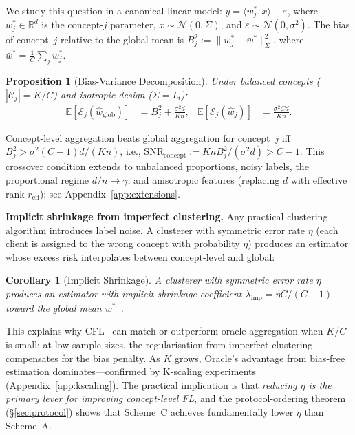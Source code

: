 \documentclass[11pt]{article}
\newcommand{\E}{\mathbb{E}}
\newcommand{\R}{\mathbb{R}}
\newcommand{\cC}{\mathcal{C}}
\newcommand{\cE}{\mathcal{E}}
\newcommand{\SNR}{\mathrm{SNR}_{\mathrm{concept}}}
\newcommand{\wstar}{w^*}
\newcommand{\what}{\hat{w}}
\newcommand{\wbar}{\bar{w}}
\newtheorem{proposition}[theorem]{Proposition}
\newtheorem{corollary}[theorem]{Corollary}
\begin{document}
We study this question in a canonical linear model: $y = \langle \wstar_j, x \rangle + \varepsilon$, where $\wstar_j \in \R^d$ is the concept-$j$ parameter, $x \sim \mathcal{N}(0, \Sigma)$, and $\varepsilon \sim \mathcal{N}(0, \sigma^2)$.
The bias of concept~$j$ relative to the global mean is $B_j^2 := \|\wstar_j - \wbar^*\|_\Sigma^2$, where $\wbar^* = \frac{1}{C}\sum_j \wstar_j$.

\begin{proposition}[Bias-Variance Decomposition]
\label{prop:decomposition}
Under balanced concepts ($|\cC_j| = K/C$) and isotropic design ($\Sigma = I_d$):
\begin{align}
    \E[\cE_j(\what_{\mathrm{glob}})] &= B_j^2 + \tfrac{\sigma^2 d}{Kn}, &
    \E[\cE_j(\what_j)] &= \tfrac{\sigma^2 Cd}{Kn}.
\end{align}
\end{proposition}
Concept-level aggregation beats global aggregation for concept~$j$ iff $B_j^2 > \sigma^2(C{-}1)d/(Kn)$, i.e., $\SNR := KnB_j^2/(\sigma^2 d) > C{-}1$.
This crossover condition extends to unbalanced proportions, noisy labels, the proportional regime $d/n \to \gamma$, and anisotropic features (replacing $d$ with effective rank $r_{\mathrm{eff}}$); see Appendix~\ref{app:extensions}.

\textbf{Implicit shrinkage from imperfect clustering.}
Any practical clustering algorithm introduces label noise.
A clusterer with symmetric error rate $\eta$ (each client is assigned to the wrong concept with probability $\eta$) produces an estimator whose excess risk interpolates between concept-level and global:

\begin{corollary}[Implicit Shrinkage]
\label{cor:implicit}
A clusterer with symmetric error rate $\eta$ produces an estimator with implicit shrinkage coefficient $\lambda_{\mathrm{imp}} = \eta C/(C{-}1)$ toward the global mean $\wbar^*$~\citep{efron1973stein, james1961estimation}.
\end{corollary}

\noindent This explains why CFL~\citep{sattler2021clustered} can match or outperform oracle aggregation when $K/C$ is small: at low sample sizes, the regularisation from imperfect clustering compensates for the bias penalty.
As $K$ grows, Oracle's advantage from bias-free estimation dominates---confirmed by K-scaling experiments (Appendix~\ref{app:kscaling}).
The practical implication is that \emph{reducing $\eta$ is the primary lever for improving concept-level FL}, and the protocol-ordering theorem (\S\ref{sec:protocol}) shows that Scheme~C achieves fundamentally lower $\eta$ than Scheme~A.
\end{document}
